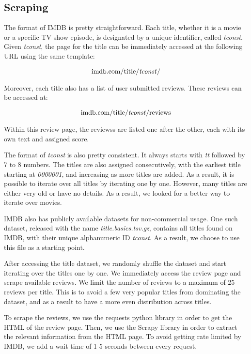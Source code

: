 \documentclass[12pt]{article}    %
\begin{document}
\subsection{Scraping}

The format of IMDB is pretty straightforward. Each title, whether it is a movie or a specific TV show episode, is designated by a unique identifier, called \textit{tconst}. Given \textit{tconst}, the page for the title can be immediately accessed at the following URL using the same template: 

\begin{align*}
    \text{imdb.com/title/\textit{tconst}/}
\end{align*}

Moreover, each title also has a list of user submitted reviews. These reviews can be accessed at: 

\begin{align*}
    \text{imdb.com/title/\textit{tconst}/reviews}
\end{align*}

Within this review page, the reviewss are listed one after the other, each with its own text and assigned score. 

The format of \textit{tconst} is also pretty consistent. It always starts with \textit{tt} followed by 7 to 8 numbers. The titles are also assigned consecutively, with the earliest title starting at \textit{0000001}, and increasing as more titles are added. As a result, it is possible to iterate over all titles by iterating one by one. However, many titles are either very old or have no details. As a result, we looked for a better way to iterate over movies.

IMDB also has publicly available datasets for non-commercial usage. One such dataset, released with the name \textit{title.basics.tsv.gz}, contains all titles found on IMDB, with their unique alphanumeric ID \textit{tconst}. As a result, we choose to use this file as a starting point.

After accessing the title dataset, we randomly shuffle the dataset and start iterating over the titles one by one. We immediately access the review page and scrape available reviews. We limit the number of reviews to a maximum of 25 reviews per title. This is to avoid a few very popular titles from dominating the dataset, and as a result to have a more even distribution across titles.

To scrape the reviews, we use the requests python library in order to get the HTML of the review page. Then, we use the Scrapy library in order to extract the relevant information from the HTML page. To avoid getting rate limited by IMDB, we add a wait time of 1-5 seconds between every request.
\end{document}
